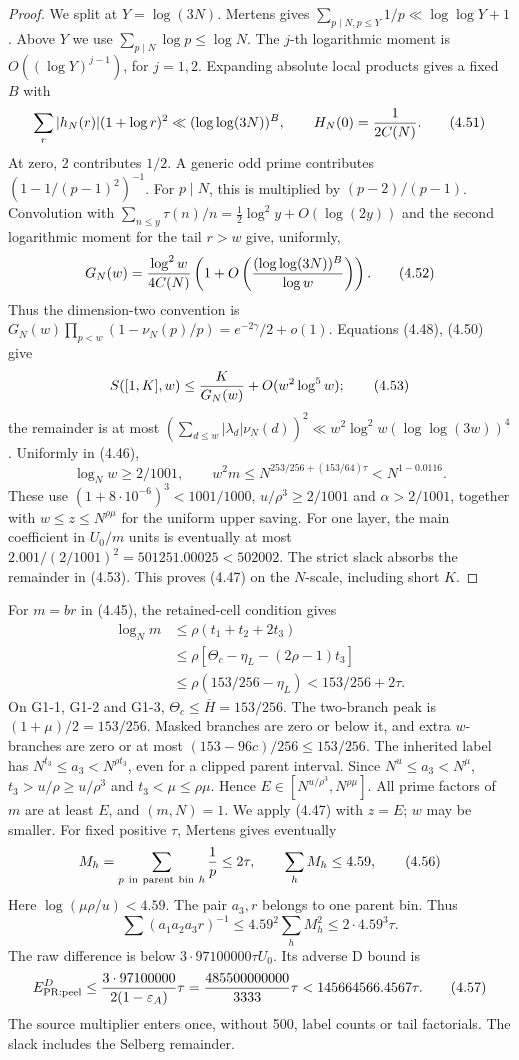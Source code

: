 \begin{proof}
We split at $Y=\log(3N)$.
Mertens gives $\sum_{p\mid N,p\le Y}1/p\ll\log\log Y+1$.
Above $Y$ we use $\sum_{p\mid N}\log p\le\log N$.
The $j$-th logarithmic moment is $O((\log Y)^{j-1})$, for $j=1,2$.
Expanding absolute local products gives a fixed $B$ with
\[
 \sum_r|h_N(r)|(1+\log r)^2\ll(\log\log(3N))^B,\qquad
 H_N(0)={1\over2C(N)}.
 \tag{4.51}
\]
At zero, 2 contributes $1/2$.
A generic odd prime contributes $(1-1/(p-1)^2)^{-1}$.
For $p\mid N$, this is multiplied by $(p-2)/(p-1)$.
Convolution with $\sum_{n\le y}\tau(n)/n=\frac12\log^2y+O(\log(2y))$
and the second logarithmic moment for the tail $r>w$ give, uniformly,
\[
 G_N(w)={\log^2w\over4C(N)}
       \left(1+O\left({(\log\log(3N))^B\over\log w}\right)\right).
 \tag{4.52}
\]
Thus the dimension-two convention is
$G_N(w)\prod_{p<w}(1-\nu_N(p)/p)=e^{-2\gamma}/2+o(1)$.
Equations (4.48), (4.50) give
\[
 S([1,K],w)\le {K\over G_N(w)}+O(w^2\log^5w);
 \tag{4.53}
\]
the remainder is at most
$(\sum_{d\le w}|\lambda_d|\nu_N(d))^2
\ll w^2\log^2w(\log\log(3w))^4$.
Uniformly in (4.46),
\[
 \log_Nw\ge2/1001,\qquad
 w^2m\le N^{253/256+(153/64)\tau}<N^{1-0.0116}.
 \tag{4.54}
\]
These use $(1+8\cdot10^{-6})^3<1001/1000$, $u/\rho^3\ge2/1001$ and $\alpha>2/1001$,
together with $w\le z\le N^{\rho\mu}$ for the uniform upper saving.
For one layer, the main coefficient in $U_0/m$ units is eventually at most
$2.001/(2/1001)^2=501251.00025<502002$.
The strict slack absorbs the remainder in (4.53).
This proves (4.47) on the $N$-scale, including short $K$.
\end{proof}

For $m=br$ in (4.45), the retained-cell condition gives
\[
 \begin{aligned}
 \log_Nm&\le\rho(t_1+t_2+2t_3)\\
 &\le\rho[\Theta_c-\eta_L-(2\rho-1)t_3]\\
 &\le\rho(153/256-\eta_L)<153/256+2\tau.
 \end{aligned}
 \tag{4.55}
\]
On G1-1, G1-2 and G1-3, $\Theta_c\le\overline H=153/256$.
The two-branch peak is $(1+\mu)/2=153/256$.
Masked branches are zero or below it, and extra $w$-branches are zero or at most $(153-96c)/256\le153/256$.
The inherited label has $N^{t_3}\le a_3<N^{\rho t_3}$,
even for a clipped parent interval.
Since $N^u\le a_3<N^\mu$,
$t_3>u/\rho\ge u/\rho^3$ and $t_3<\mu\le\rho\mu$.
Hence $E\in[N^{u/\rho^3},N^{\rho\mu}]$.
All prime factors of $m$ are at least $E$, and $(m,N)=1$.
We apply (4.47) with $z=E$; $w$ may be smaller.
For fixed positive $\tau$, Mertens gives eventually
\[
 M_h=\sum_{p\ {\rm in\ parent\ bin}\ h}{1\over p}\le2\tau,
 \qquad\sum_hM_h\le4.59,
 \tag{4.56}
\]
Here $\log(\mu\rho/u)<4.59$.
The pair $a_3,r$ belongs to one parent bin. Thus
\[
\sum(a_1a_2a_3r)^{-1}\le4.59^2\sum_hM_h^2
\le2\cdot4.59^3\tau.
\]
The raw difference is below $3\cdot97100000\tau U_0$.
Its adverse D bound is
\[
 E^D_{\rm PR:peel}\le {3\cdot97100000\over2(1-\varepsilon_A)}\tau
 ={485500000000\over3333}\tau<145664566.4567\tau.
 \tag{4.57}
\]
The source multiplier enters once, without 500, label counts or tail factorials.
The slack includes the Selberg remainder.

